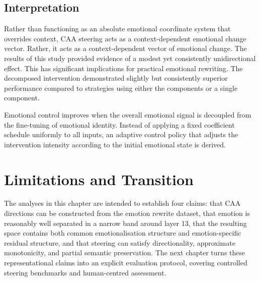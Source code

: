 \subsection*{Interpretation}
Rather than functioning as an absolute emotional coordinate system that overrides context, CAA steering acts as a context-dependent emotional change vector. Rather, it acts as a context-dependent vector of emotional change. The results of this study provided evidence of a modest yet consistently unidirectional effect. This has significant implications for practical emotional rewriting. The decomposed intervention demonstrated slightly but consistently superior performance compared to strategies using either the components or a single component. \par

Emotional control improves when the overall emotional signal is decoupled from the fine-tuning of emotional identity. Instead of applying a fixed coefficient schedule uniformly to all inputs, an adaptive control policy that adjusts the intervention intensity according to the initial emotional state is derived.

\section{Limitations and Transition}

The analyses in this chapter are intended to establish four claims: that CAA directions can be constructed from the emotion rewrite dataset, that emotion is reasonably well separated in a narrow band around layer 13, that the resulting space contains both common emotionalisation structure and emotion-specific residual structure, and that steering can satisfy directionality, approximate monotonicity, and partial semantic preservation. The next chapter turns these representational claims into an explicit evaluation protocol, covering controlled steering benchmarks and human-centred assessment.